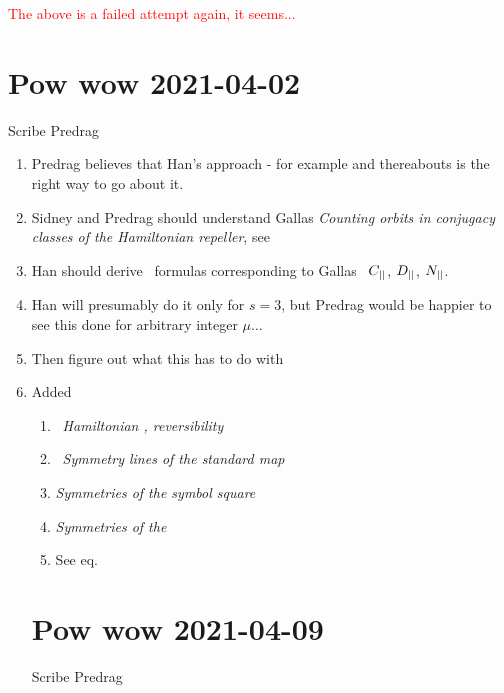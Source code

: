     {\textcolor{red}{The above is a failed attempt again,
    it seems...}}

\section{Pow wow 2021-04-02}
\label{sect:pw2021-04-02}

Scribe Predrag
\medskip

\begin{enumerate}
  \item
Predrag believes that
Han's approach - for example  and thereabouts is
the right way to go about it.
  \item
Sidney and Predrag should understand
Gallas {\em Counting orbits in conjugacy classes of
the {{\Henon} Hamiltonian} repeller}, see 
  \item
Han should derive \templatt\ formulas corresponding to Gallas \Henon\
$C_{||}$, $D_{||}$, $N_{||}$.
  \item
Han will presumably do it only for $s=3$, but Predrag would be happier to
see this done for arbitrary integer $\mu$...
  \item
Then figure out what this has to do with \Dn{\cl{}}
  \item
  Added
\begin{enumerate}
  \item
{}~{\em Hamiltonian {\HenonMap}, reversibility}
  \item
{}~{\em Symmetry lines of the standard map}
  \item
{} {\em Symmetries of the symbol square}
  \item
{} {\em Symmetries of the \topp}
  \item
See eq.~
\end{enumerate}


\section{Pow wow 2021-04-09}
\label{sect:pw2021-04-09}

Scribe Predrag
\medskip


\end{enumerate}
